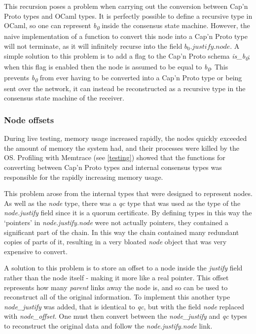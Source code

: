 This recursion poses a problem when carrying out the conversion between Cap'n Proto types and OCaml types. It is perfectly possible to define a recursive type in OCaml, so one can represent \textit{b\textsubscript{0}} inside the consensus state machine. However, the naive implementation of a function to convert this node into a Cap'n Proto type will not terminate, as it will infinitely recurse into the field $ b_0.\textit{justify}.\textit{node} $. A simple solution to this problem is to add a flag to the Cap'n Proto schema \textit{is\_b\textsubscript{0}}; when this flag is enabled then the node is assumed to be equal to \textit{b\textsubscript{0}}. This prevents \textit{b\textsubscript{0}} from ever having to be converted into a Cap'n Proto type or being sent over the network, it can instead be reconstructed as a recursive type in the consensus state machine of the receiver.

\subsubsection{Node offsets}
During live testing, memory usage increased rapidly, the nodes quickly exceeded the amount of memory the system had, and their processes were killed by the OS. Profiling with Memtrace (see \ref{testing}) showed that the functions for converting between Cap'n Proto types and internal consensus types was responsible for the rapidly increasing memory usage.

This problem arose from the internal types that were designed to represent nodes. As well as the \textit{node} type, there was a \textit{qc} type that was used as the type of the \textit{node.justify} field since it is a quorum certificate. By defining types in this way the `pointers' in \textit{node.justify.node} were not actually pointers, they contained a significant part of the chain. In this way the chain contained many redundant copies of parts of it, resulting in a very bloated \textit{node} object that was very expensive to convert.

A solution to this problem is to store an offset to a node inside the \textit{justify} field rather than the node itself - making it more like a real pointer. This offset represents how many \textit{parent} links away the node is, and so can be used to reconstruct all of the original information. To implement this another type \textit{node\_justify} was added, that is identical to \textit{qc}, but with the field \textit{node} replaced with \textit{node\_offset}. One must then convert between the \textit{node\_justify} and \textit{qc} types to reconstruct the original data and follow the \textit{node.justify.node} link.

